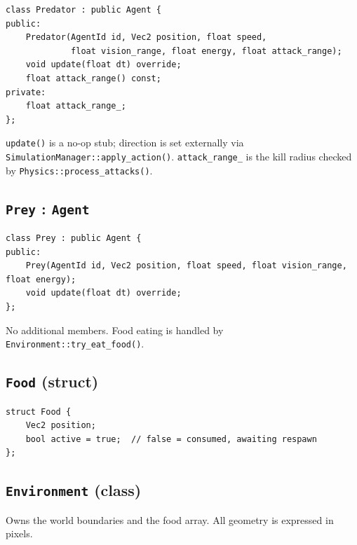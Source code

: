 \begin{lstlisting}
class Predator : public Agent {
public:
    Predator(AgentId id, Vec2 position, float speed,
             float vision_range, float energy, float attack_range);
    void update(float dt) override;
    float attack_range() const;
private:
    float attack_range_;
};
\end{lstlisting}

\texttt{update()} is a no-op stub; direction is set externally via
\texttt{SimulationManager::apply\_action()}.  \texttt{attack\_range\_} is the kill radius
checked by \texttt{Physics::process\_attacks()}.

\subsection{\texttt{Prey} : \texttt{Agent}}

\begin{lstlisting}
class Prey : public Agent {
public:
    Prey(AgentId id, Vec2 position, float speed, float vision_range, float energy);
    void update(float dt) override;
};
\end{lstlisting}

No additional members.  Food eating is handled by \texttt{Environment::try\_eat\_food()}.

\subsection{\texttt{Food} (struct)}

\begin{lstlisting}
struct Food {
    Vec2 position;
    bool active = true;  // false = consumed, awaiting respawn
};
\end{lstlisting}

\subsection{\texttt{Environment} (class)}

Owns the world boundaries and the food array.  All geometry is expressed in pixels.

